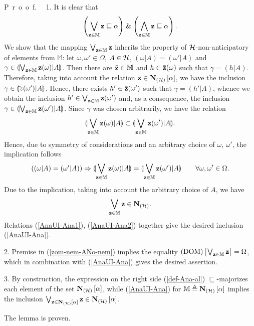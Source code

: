 \documentclass[sn-mathphys,Numbered,pdflatex]{sn-jnl}%
\theoremstyle{thmstyleone}%
\theoremstyle{thmstyletwo}%
\theoremstyle{thmstylethree}%
\renewcommand{\proof}{\par\mbox{P r o o f.}\ \ }
\newcommand{\myand}{\ensuremath{\mathrel{\&}}}%
\newcommand{\beq}{\begin{equation}}
\newcommand{\eeq}{\end{equation}}
\newcommand{\mydef}{\mathrel{\triangleq}}%
\newcommand{\res}[2]{\ensuremath{(#1|#2)}}%
\newcommand{\myimp}{\ensuremath{\mathrel{\Rightarrow}}}%
\newcommand{\myLe}{\mathrel{\sqsubseteq}}%
\newcommand{\naOm}{\ensuremath{\Omega}}%
\newcommand{\AnaN}[2]{\mathbf{N}_{(#1)}\setbox0=\hbox{\text{$#2$}}\ifdim\wd0=0pt\else\left[{#2}\right]\fi}%
\newcommand{\nado}[1]{(\mathrm{DOM})\setbox0=\hbox{\text{$#1$}}\ifdim\wd0=0pt\else\left[{#1}\right]\fi}%
\newcommand{\sres}[2]{\llparenthesis#1|#2\rrparenthesis}%
\newcommand{\fref}[1]{{\rm(\ref{#1})}}   %
\begin{document}
\proof
1.
It is clear that
\beq\label{AnaUI-Ana1}
\left(\bigvee_{{\bf z}\in\mathbb{M}}{\bf z}\myLe\alpha\right)\myand\left(\bigwedge_{{\bf z}\in\mathbb{M }}{\bf z}\myLe\alpha\right).
\eeq
We show that the mapping $\bigvee_{{\bf z}\in\mathbb{M}}{\bf z}$ inherits the property of ${\cal H}$-non-anticipatory of elements from $\mathbb{M}$: let $ \omega,\omega'\in\naOm$, $A\in{\cal H}$, $\res\omega A=\res{\omega'}A$ and $\gamma\in\sres{\bigvee_ {{\bf z}\in\mathbb{M}}{\bf z}(\omega)}A$.
Then there are $\bar{\bf z}\in\mathbb{M}$ and $h\in\bar{\bf z}(\omega)$ such that $\gamma=\res hA$.
Therefore, taking into account the relation $\bar{\bf z}\in\AnaN{\cal H}\alpha$, we have the inclusion $\gamma\in\sres{\bar\bf z(\omega')}A$.
Hence, there exists $h'\in\bar{\bf z}(\omega')$ such that $\gamma=\res{h'}A$, whence we obtain the inclusion $h'\in\bigvee_{{\bf z}\in\mathbb{M}}{\bf z}(\omega')$ and, as a consequence, the inclusion $\gamma\in\sres{\bigvee_{{\bf z}\in\mathbb{M }}{\bf z}(\omega')}A$.
Since $\gamma$ was chosen arbitrarily, we have the relation
$$
\sres{\bigvee_{{\bf z}\in\mathbb{M}}{\bf z}(\omega)}A\subset\sres{\bigvee_{{\bf z}\in\mathbb{M} }{\bf z}(\omega')}A.
$$
Hence, due to symmetry of considerations and an arbitrary choice of $\omega$, $\omega'$, the implication follows
$$
(\res\omega A=\res{\omega'} A)\myimp\sres{\bigvee_{{\bf z}\in\mathbb{M}}{\bf z}(\omega)}A=\sres{\bigvee_{{\bf z}\in\mathbb{M}}{\bf z}(\omega')}A\qquad\forall\omega,\omega'\in\naOm.
$$
Due to the implication, taking into account the arbitrary choice of $A$, we have
\beq\label{AnaUI-Ana2}
\bigvee_{{\bf z}\in\mathbb{M}}{\bf z}\in\AnaN{\cal H}{}.
\eeq
Relations \fref{AnaUI-Ana1}, \fref{AnaUI-Ana2} together give the desired inclusion \fref{AnaUI-Ana}.

2.
Premise in \fref{zom-nem-ANo-nem} implies the equality $\nado{\bigvee_{{\bf z}\in\mathbb{M}}{\bf z}}=\naOm$, which in combination with \fref{AnaUI-Ana} gives the desired assertion.

3.
By construction, the expression on the right side \fref{def-Ana-al} $\myLe$-majorizes each element of the set $\AnaN{\cal H}\alpha$, while \fref{AnaUI-Ana} for $\mathbb{ M}\mydef\AnaN{\cal H}\alpha$ implies the inclusion $\bigvee_{{\bf z}\in\AnaN{\cal H}\alpha}{\bf z}\in\AnaN{\cal H }\alpha$.

The lemma is proven.


\bigskip
\end{document}
